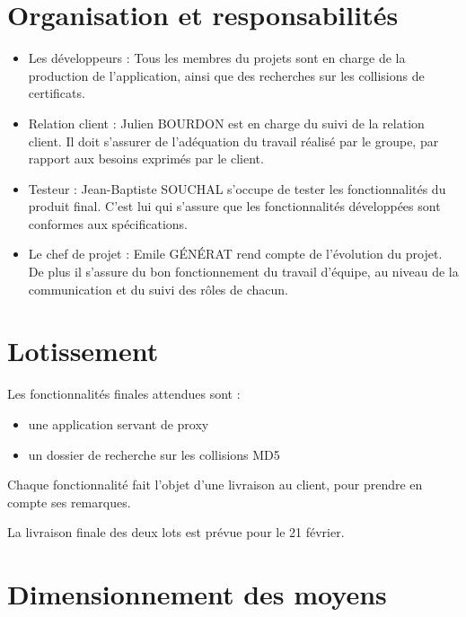 \documentclass[a4paper,11pt,french]{article}
\begin{document}
\newpage
\section{Organisation et responsabilités}

\begin{itemize}
\item Les développeurs : Tous les membres du projets sont en charge de la production de l'application, ainsi que des recherches sur les collisions de certificats.

\item Relation client : Julien BOURDON est en charge du suivi de la relation client. Il doit s'assurer de l'adéquation du travail réalisé par le groupe, par rapport aux besoins exprimés par le client.

\item Testeur : Jean-Baptiste SOUCHAL s'occupe de tester les fonctionnalités du produit final. C'est lui qui s'assure que les fonctionnalités développées sont conformes aux spécifications.

\item Le chef de projet : Emile GÉNÉRAT rend compte de l'évolution du projet. De plus il s'assure du bon fonctionnement du travail d'équipe, au niveau de la communication et du suivi des rôles de chacun.
\end{itemize}

\newpage
\section{Lotissement}

Les fonctionnalités finales attendues sont :
\begin{itemize}
\item une application servant de proxy  
\item un dossier de recherche sur les collisions MD5
\end{itemize}

Chaque fonctionnalité fait l'objet d'une livraison au client, pour prendre en compte ses remarques.

La livraison finale des deux lots est prévue pour le 21 février.

\newpage
\section{Dimensionnement des moyens}
\end{document}
